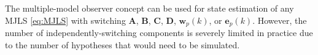 {%
%

The multiple-model observer concept can be used for state estimation of any MJLS \eqref{eq:MJLS} with switching $\mathbf{A}$, $\mathbf{B}$, $\mathbf{C}$, $\mathbf{D}$, $\mathbf{w}_p(k)$, or $\mathbf{e}_p(k)$. However, the number of independently-switching components is severely limited in practice due to the number of hypotheses that would need to be simulated.

}
